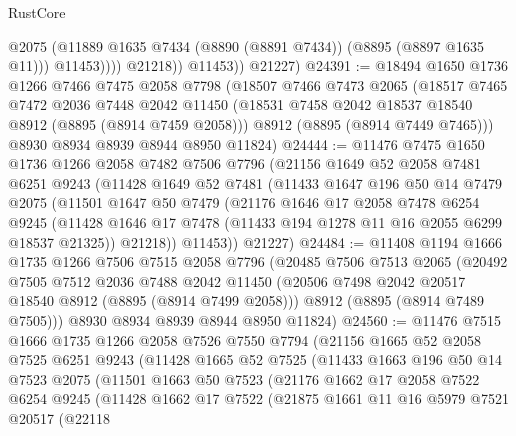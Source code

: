 \begin{lexlean}{RustCore}
\begin{coremodule}
                      @2075
                      (@11889 @1635 @7434 (@8890 (@8891 @7434)) (@8895 (@8897 @1635 @11)))
                      @11453))))
              @21218))
          @11453))
      @21227)
@24391 := @18494
    @1650
    @1736
    @1266
    @7466
    @7475
    @2058
    @7798
    (@18507
      @7466
      @7473
      @2065
      (@18517
        @7465
        @7472
        @2036
        @7448
        @2042
        @11450
        (@18531 @7458 @2042 @18537 @18540 @8912 (@8895 (@8914 @7459 @2058)))
        @8912
        (@8895 (@8914 @7449 @7465)))
      @8930
      @8934
      @8939
      @8944
      @8950
      @11824)
@24444 := @11476
    @7475
    @1650
    @1736
    @1266
    @2058
    @7482
    @7506
    @7796
    (@21156
      @1649
      @52
      @2058
      @7481
      @6251
      @9243
      (@11428
        @1649
        @52
        @7481
        (@11433
          @1647
          @196
          @50
          @14
          @7479
          @2075
          (@11501
            @1647
            @50
            @7479
            (@21176
              @1646
              @17
              @2058
              @7478
              @6254
              @9245
              (@11428 @1646 @17 @7478 (@11433 @194 @1278 @11 @16 @2055 @6299 @18537 @21325))
              @21218))
          @11453))
      @21227)
@24484 := @11408
    @1194
    @1666
    @1735
    @1266
    @7506
    @7515
    @2058
    @7796
    (@20485
      @7506
      @7513
      @2065
      (@20492
        @7505
        @7512
        @2036
        @7488
        @2042
        @11450
        (@20506 @7498 @2042 @20517 @18540 @8912 (@8895 (@8914 @7499 @2058)))
        @8912
        (@8895 (@8914 @7489 @7505)))
      @8930
      @8934
      @8939
      @8944
      @8950
      @11824)
@24560 := @11476
    @7515
    @1666
    @1735
    @1266
    @2058
    @7526
    @7550
    @7794
    (@21156
      @1665
      @52
      @2058
      @7525
      @6251
      @9243
      (@11428
        @1665
        @52
        @7525
        (@11433
          @1663
          @196
          @50
          @14
          @7523
          @2075
          (@11501
            @1663
            @50
            @7523
            (@21176
              @1662
              @17
              @2058
              @7522
              @6254
              @9245
              (@11428
                @1662
                @17
                @7522
                (@21875
                  @1661
                  @11
                  @16
                  @5979
                  @7521
                  @20517
                  (@22118

\end{coremodule}
\end{lexlean}
